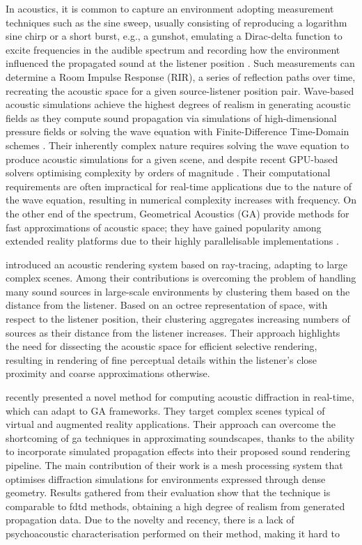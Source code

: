 In acoustics, it is common to capture an environment adopting measurement techniques such as the sine sweep, usually consisting of reproducing a logarithm sine chirp or a short burst, e.g., a gunshot,  emulating a Dirac-delta function to excite frequencies in the audible spectrum and recording how the environment influenced the propagated sound at the listener position \citep{reilly1995convolution}. Such measurements can determine a Room Impulse Response (RIR), a series of reflection paths over time, recreating the acoustic space for a given source-listener position pair. Wave-based acoustic simulations achieve the highest degrees of realism in generating acoustic fields as they compute sound propagation via simulations of high-dimensional pressure fields \citep{raghuvanshi2014parametric} or solving the wave equation with Finite-Difference Time-Domain schemes \citep{hamilton2017fdtd}. Their inherently complex nature requires solving the wave equation to produce acoustic simulations for a given scene, and despite recent GPU-based solvers optimising complexity by orders of magnitude \citep{mehra2012efficient}. Their computational requirements are often impractical for real-time applications due to the nature of the wave equation, resulting in numerical complexity increases with frequency. On the other end of the spectrum, Geometrical Acoustics (GA) provide methods for fast approximations of acoustic space; they have gained popularity among extended reality platforms due to their highly parallelisable implementations \citep{savioja2015overview}.\par
\cite{schissler2016interactive} introduced an acoustic rendering system based on ray-tracing, adapting to large complex scenes. Among their contributions is overcoming the problem of handling many sound sources in large-scale environments by clustering them based on the distance from the listener. Based on an octree representation of space, with respect to the listener position, their clustering aggregates increasing numbers of sources as their distance from the listener increases. Their approach highlights the need for dissecting the acoustic space for efficient selective rendering, resulting in rendering of fine perceptual details within the listener's close proximity and coarse approximations otherwise.\par

\cite{schissler2021fast} recently presented a novel method for computing acoustic diffraction in real-time, which can adapt to GA frameworks. They target complex scenes typical of virtual and augmented reality applications. Their approach can overcome the shortcoming of \acrshort{ga} techniques in approximating soundscapes, thanks to the ability to incorporate simulated propagation effects into their proposed sound rendering pipeline. The main contribution of their work is a mesh processing system that optimises diffraction simulations for environments expressed through dense geometry. Results gathered from their evaluation show that the technique is comparable to \acrshort{fdtd} methods, obtaining a high degree of realism from generated propagation data. Due to the novelty and recency, there is a lack of psychoacoustic characterisation performed on their method, making it hard to \par

